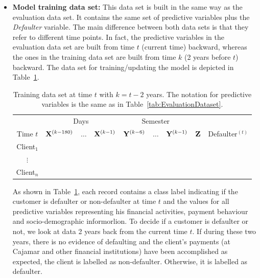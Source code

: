 \begin{itemize}
\item \textbf{Model training data set:}  This data set is built in the same way as the evaluation data set. It contains the same set of predictive variables plus the \textit{Defaulter} variable. The main difference between both data sets is that they refer to different time points. In fact, the predictive variables in the evaluation data set are built from time $t$ (current time) backward, whereas the ones in the training data set are built from time $k$ (2 years before $t$) backward. The data set for training/updating the model is depicted in Table~\ref{tab:TrainingDataset}.
\begin{table}[h]
\centering
\begin{tabular}{c|ccc|ccc|c|c}
	&\multicolumn{3}{c|}{Days} & \multicolumn{3}{c|}{Semester} & \\
     Time $t$              & $\mathbf{X}^{(k-180)}$ & $\ldots$ & $\mathbf{X}^{(k-1)} $ & $\mathbf{Y}^{(k-6)}$  & $\ldots$ & $\mathbf{Y}^{(k-1)} $ & $\mathbf{Z}$ & Defaulter$^{(t)}$\\  
\hline
Client$_1$  &                                                  &              &                     &                               &                     &        &  \\ 
$\vdots$      &                                                 &               &                     &                                &                     &       & \\ 
Client$_n$  &                                                &               &                     &                                &                     &     & \\ 
\end{tabular} 
\caption{Training data set at time $t$ with $k=t - 2$ years.  The notation for predictive variables is the same as in Table~\ref{tab:EvaluationDataset}.}
\label{tab:TrainingDataset} 
\end{table}

As shown in Table~\ref{tab:TrainingDataset}, each record contains a class label indicating if the customer is defaulter or non-defaulter at time $t$ and the values for all predictive variables representing his financial activities, payment behaviour and socio-demographic informorlion. To decide if a customer is defaulter or not, we look at data 2 years back from the current time $t$. If during these two years, there is no evidence of defaulting and the client's payments (at Cajamar and other financial institutions) have been accomplished as expected, the client is labelled as non-defaulter. Otherwise, it is labelled as defaulter.
\end{itemize}

